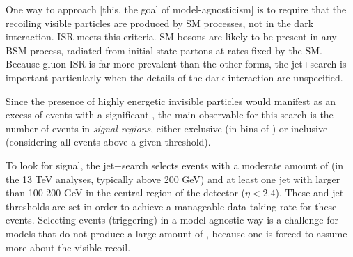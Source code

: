 One way to approach [this, the goal of model-agnosticism] is to require that the recoiling visible particles are produced by SM processes, not in the dark interaction. ISR meets this criteria. SM bosons are likely to be present in any BSM process, radiated from initial state partons at rates fixed by the SM. Because gluon ISR is far more prevalent than the other forms, the jet+\MET search is important particularly when the details of the dark interaction are unspecified.

Since the presence of highly energetic invisible particles would manifest as an excess of events with a significant \MET, the main observable for this search is the number of events in \MET \textit{signal regions}, either exclusive (in bins of \MET) or inclusive (considering all events above a given \MET threshold). 

To look for signal, the jet+\MET search selects events with a moderate amount of \MET (in the 13 TeV analyses, typically above 200 GeV) and at least one jet with \pt larger than 100-200 GeV in the central region of the detector ($\eta<2.4$). 
These \MET and jet \pt thresholds are set in order to achieve a manageable data-taking rate for these events. Selecting events (triggering) in a model-agnostic way is a challenge for models that do not produce a large amount of \MET, because one is forced to assume more about the visible recoil. 


\begin{marginnote}[]
\end{marginnote}


